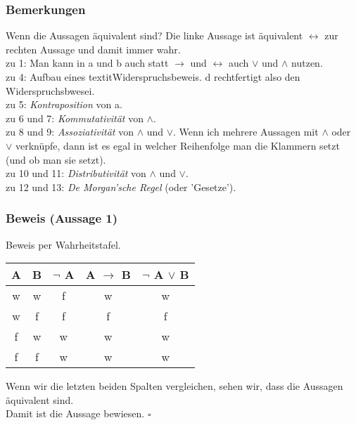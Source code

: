 \documentclass{article}
\begin{document}
\subsubsection*{Bemerkungen}
Wenn die Aussagen äquivalent sind? Die linke Aussage ist äquivalent $\leftrightarrow$ zur rechten Aussage und damit immer wahr. \\
zu 1: Man kann in a und b auch statt $\rightarrow$ und $\leftrightarrow$ auch $\vee$ und $\wedge$ nutzen. \\
zu 4: Aufbau eines textit{Widerspruchsbeweis}. d rechtfertigt also den Widerspruchsbwesei. \\
zu 5: \textit{Kontraposition} von a. \\
zu 6 und 7: \textit{Kommutativität} von $\wedge$. \\
zu 8 und 9: \textit{Assoziativität} von $\wedge$ und $\vee$. Wenn ich mehrere Aussagen mit $\wedge$ oder $\vee$ verknüpfe, dann ist es egal in welcher Reihenfolge man die Klammern setzt (und ob man sie setzt). \\
zu 10 und 11: \textit{Distributivität} von $\wedge$ und $\vee$. \\
zu 12 und 13: \textit{De Morgan'sche Regel} (oder 'Gesetze'). \\

\subsubsection*{Beweis (Aussage 1)}
Beweis per Wahrheitstafel. \\
\begin{center}
    \begin{tabular}{|c|c|c|c|c|}
        \hline
        A & B & $\neg$ A & A $\rightarrow$ B & $\neg$ A $\vee$ B \\
        \hline
        \hline
        w & w & f & w & w \\
        w & f & f & f & f \\
        f & w & w & w & w \\
        f & f & w & w & w \\
        \hline
    \end{tabular}
\end{center}
Wenn wir die letzten beiden Spalten vergleichen, sehen wir, dass die Aussagen äquivalent sind. \\
Damit ist die Aussage bewiesen. $\square$\\

\end{document}
